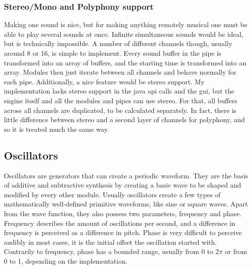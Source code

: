 \documentclass[11pt,a4paper]{article}
\begin{document}
\subsubsection{Stereo/Mono and Polyphony support}

Making one sound is nice, but for making anything remotely musical one must be able to play several sounds at once. Infinite simultaneous sounds would be ideal, but is technically impossible. A number of different channels though, usually around 8 or 16, is simple to implement. Every sound buffer in the pipe is transformed into an array of buffers, and the starting time is transformed into an array. Modules then just iterate between all channels and behave normally for each pipe.
Additionally, a nice feature would be stereo support. My implementation lacks stereo support in the java api calls and the gui, but the engine itself and all the modules and pipes can use stereo. For that, all buffers across all channels are duplicated, to be calculated separately. In fact, there is little difference between stereo and a second layer of channels for polyphony, and so it is treated much the same way.

\subsection{Oscillators}

Oscillators are generators that can create a periodic waveform. They are the basis of additive and subtractive synthesis by creating a basic wave to be shaped and modified by every other module. Usually oscillators create a few types of mathematically well-defined primitive waveforms, like sine or square waves. Apart from the wave function, they also possess two parameters, frequency and phase. Frequency describes the amount of oscillations per second, and a difference in frequency is perceived as a difference in pitch. Phase is very difficult to perceive audibly in most cases, it is the initial offset the oscillation started with. Contrarily to frequency, phase has a bounded range, usually from 0 to 2$\pi$ or from 0 to 1, depending on the implementation.
\end{document}
